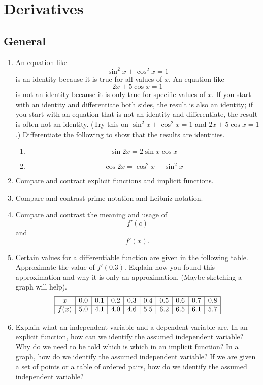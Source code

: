 \chapter{Derivatives}\section{General}

\begin{enumerate}

\item  An equation like $$\sin ^2 x + \cos ^2 x = 1$$ is an identity because it is true for all values of $x$.  An equation like $$2x + 5 \cos x = 1$$ is not an identity because it is only true for specific values of $x$.  If you start with an identity and differentiate both sides, the result is also an identity; if you start with an equation that is not an identity and differentiate, the result is often not an identity.  (Try this on $\sin ^2 x + \cos ^2 x = 1$ and $2x + 5 \cos x = 1$.)
 Differentiate the following to show that the results are identities.   \cite{FWG}
\begin{enumerate} 

\item  $$\sin 2x = 2\sin x\cos x$$ 

\item   $$\cos 2x = \cos ^2 x - \sin ^2 x$$ \end{enumerate}


\item  Compare and contract explicit functions and implicit functions.

\item  Compare and contrast prime notation and Leibniz notation.

\item  Compare and contrast the meaning and usage of $$f'(c)$$ and $$f'(x).$$

\item  Certain values for a differentiable function are given in the following table.  Approximate the value of $f'(0.3).$  Explain how you found this approximation and why it is only an approximation.  (Maybe sketching a graph will help).
$$\begin{array}{|c|c|c|c|c|c|c|c|c|c|}\hline  x & 0.0 & 0.1 & 0.2 & 0.3 & 0.4 & 0.5 & 0.6 & 0.7 & 0.8  \cr \hline  f(x) & 5.0 & 4.1 & 4.0 & 4.6 & 5.5 & 6.2 & 6.5 & 6.1 & 5.7  \cr \hline  \end{array}$$

\item  Explain what an independent variable and a dependent variable are.  In an explicit function, how can we identify the assumed independent variable?  Why do we need to be told which is which in an implicit function?  In a graph, how do we identify the assumed independent variable?  If we are given a set of points or a table of ordered pairs, how do we identify the assumed independent variable?


\end{enumerate}
